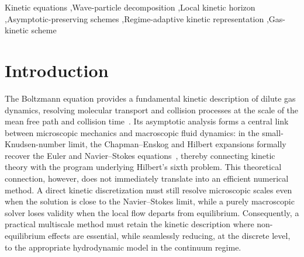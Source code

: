 \documentclass[preprint,12pt]{elsarticle}
\begin{document}
\begin{frontmatter}
\begin{abstract}
\end{abstract}

\begin{keyword}
Kinetic equations \sep Wave-particle decomposition \sep Local kinetic horizon \sep Asymptotic-preserving schemes \sep Regime-adaptive kinetic representation \sep Gas-kinetic scheme
\end{keyword}
\end{frontmatter}

\section{Introduction}\label{sec:intro}

The Boltzmann equation provides a fundamental kinetic description of dilute gas dynamics, resolving molecular transport and collision processes at the scale of the mean free path and collision time~\cite{boltzmann1872,cercignani1988}. Its asymptotic analysis forms a central link between microscopic mechanics and macroscopic fluid dynamics: in the small-Knudsen-number limit, the Chapman--Enskog and Hilbert expansions formally recover the Euler and Navier--Stokes equations~\cite{chapman1970}, thereby connecting kinetic theory with the program underlying Hilbert's sixth problem. This theoretical connection, however, does not immediately translate into an efficient numerical method. A direct kinetic discretization must still resolve microscopic scales even when the solution is close to the Navier--Stokes limit, while a purely macroscopic solver loses validity when the local flow departs from equilibrium. Consequently, a practical multiscale method must retain the kinetic description where non-equilibrium effects are essential, while seamlessly reducing, at the discrete level, to the appropriate hydrodynamic model in the continuum regime.
\end{document}

